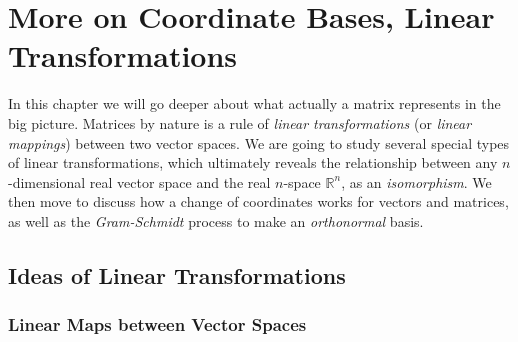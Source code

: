 \chapter{More on Coordinate Bases, Linear Transformations}

In this chapter we will go deeper about what actually a matrix represents in the big picture. Matrices by nature is a rule of \textit{linear transformations} (or \textit{linear mappings}) between two vector spaces. We are going to study several special types of linear transformations, which ultimately reveals the relationship between any $n$-dimensional real vector space and the real $n$-space $\mathbb{R}^n$, as an \textit{isomorphism}. We then move to discuss how a change of coordinates works for vectors and matrices, as well as the \textit{Gram-Schmidt} process to make an \textit{orthonormal} basis.

\section{Ideas of Linear Transformations}

\subsection{Linear Maps between Vector Spaces}

